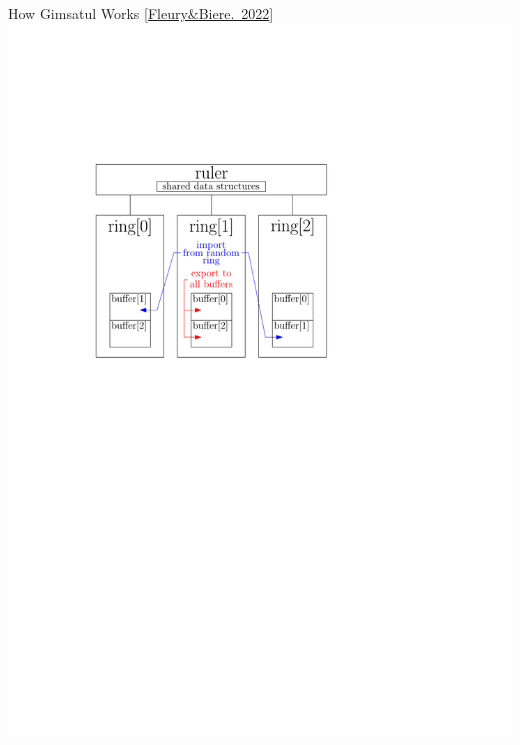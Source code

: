 \documentclass[]{sdqbeamer}
\begin{document}
\begin{frame}{How Gimsatul Works [\href{https://arxiv.org/pdf/2207.13577}{Fleury\&Biere.~2022}]}
    \center
    \includegraphics[scale=1.5]{figures/gimsatul_architecture.pdf}
\end{frame}

\end{document}
